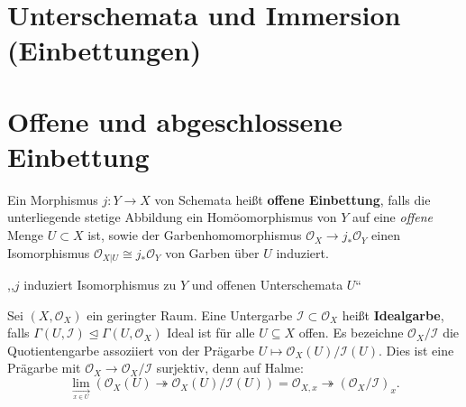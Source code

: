 \section*{Unterschemata und Immersion (Einbettungen)}

\section{Offene und abgeschlossene Einbettung}
\begin{defn}[33]
  Ein Morphismus $j:Y\rightarrow X$ von Schemata heißt \textbf{offene
    Einbettung}, falls die unterliegende stetige Abbildung ein Homöomorphismus
  von $Y$ auf eine \emph{offene} Menge $U\subset X$ ist, sowie der
  Garbenhomomorphismus $\mathcal{O}_{X}\rightarrow j_{\ast}\mathcal{O}_{Y}$
  einen Isomorphismus $\mathcal{O}_{X|U}\cong j_{\ast}\mathcal{O}_{Y}$
  von Garben über $U$ induziert.
\end{defn}

,,$j$ induziert Isomorphismus zu $Y$ und offenen Unterschemata
$U$``
\begin{defn}[34]
  Sei $(X,\mathcal{O}_{X})$ ein geringter Raum. Eine Untergarbe $\mathcal{I}\subset\mathcal{O}_{X}$
  heißt \textbf{Idealgarbe}, falls $\Gamma(U,\mathcal{I})\unlhd\Gamma(U,\mathcal{O}_{X})$
  Ideal ist für alle $U\subseteq X$ offen. Es bezeichne $\mathcal{O}_{X}/\mathcal{I}$
  die Quotientengarbe assoziiert von der Prägarbe $U\mapsto\mathcal{O}_{X}(U)/\mathcal{I}(U)$.
  Dies ist eine Prägarbe mit $\mathcal{O}_{X}\rightarrow\mathcal{O}_{X}/\mathcal{I}$
  surjektiv, denn auf Halme:
  \[
    \underset{\underset{x\in U}{\longrightarrow}}{\lim}(\mathcal{O}_{X}(U)\twoheadrightarrow\mathcal{O}_{X}(U)/\mathcal{I}(U))=\mathcal{O}_{X,x}\twoheadrightarrow(\mathcal{O}_{X}/\mathcal{I})_{x}.
  \]
\end{defn}

